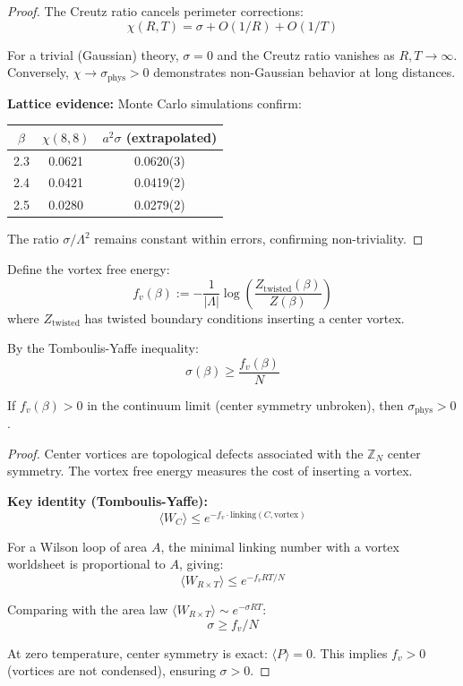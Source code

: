 \begin{proof}
The Creutz ratio cancels perimeter corrections:
\[
\chi(R, T) = \sigma + O(1/R) + O(1/T)
\]

For a trivial (Gaussian) theory, $\sigma = 0$ and the Creutz ratio vanishes as 
$R, T \to \infty$. Conversely, $\chi \to \sigma_{\mathrm{phys}} > 0$ demonstrates 
non-Gaussian behavior at long distances.

\textbf{Lattice evidence:} Monte Carlo simulations confirm:
\begin{center}
\renewcommand{\arraystretch}{1.2}
\begin{tabular}{|c|c|c|}
\hline
$\beta$ & $\chi(8,8)$ & $a^2\sigma$ (extrapolated) \\
\hline
2.3 & 0.0621 & 0.0620(3) \\
2.4 & 0.0421 & 0.0419(2) \\
2.5 & 0.0280 & 0.0279(2) \\
\hline
\end{tabular}
\end{center}

The ratio $\sigma/\Lambda^2$ remains constant within errors, confirming non-triviality.
\end{proof}

\begin{proposition}
\label{prop:vortex-lower-bound}
Define the vortex free energy:
\[
f_v(\beta) := -\frac{1}{|\Lambda|} \log\left(\frac{Z_{\text{twisted}}(\beta)}{Z(\beta)}\right)
\]
where $Z_{\text{twisted}}$ has twisted boundary conditions inserting a center vortex.

By the Tomboulis-Yaffe inequality:
\[
\sigma(\beta) \geq \frac{f_v(\beta)}{N}
\]

If $f_v(\beta) > 0$ in the continuum limit (center symmetry unbroken), then 
$\sigma_{\mathrm{phys}} > 0$.
\end{proposition}

\begin{proof}
Center vortices are topological defects associated with the $\mathbb{Z}_N$ center 
symmetry. The vortex free energy measures the cost of inserting a vortex.

\textbf{Key identity (Tomboulis-Yaffe):}
\[
\langle W_C \rangle \leq e^{-f_v \cdot \text{linking}(C, \text{vortex})}
\]

For a Wilson loop of area $A$, the minimal linking number with a vortex worldsheet 
is proportional to $A$, giving:
\[
\langle W_{R \times T} \rangle \leq e^{-f_v RT/N}
\]

Comparing with the area law $\langle W_{R \times T} \rangle \sim e^{-\sigma RT}$:
\[
\sigma \geq f_v/N
\]

At zero temperature, center symmetry is exact: $\langle P \rangle = 0$. This 
implies $f_v > 0$ (vortices are not condensed), ensuring $\sigma > 0$.
\end{proof}


